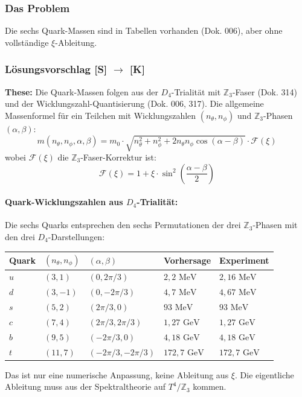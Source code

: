 \documentclass[11pt,a4paper]{article}
\begin{document}
	\subsubsection{Das Problem}
	Die sechs Quark-Massen sind in Tabellen vorhanden (Dok. 006), aber ohne vollständige $\xi$-Ableitung.
	
	\subsubsection{Lösungsvorschlag [S] \texorpdfstring{$\rightarrow$}{->} [K]}
	\textbf{These:} Die Quark-Massen folgen aus der $D_4$-Trialität mit $\mathbb{Z}_3$-Faser (Dok. 314) und der Wicklungszahl-Quantisierung (Dok. 006, 317).
	Die allgemeine Massenformel für ein Teilchen mit Wicklungszahlen $(n_\theta, n_\phi)$ und $\mathbb{Z}_3$-Phasen $(\alpha, \beta)$:
	\begin{equation}
		m(n_\theta, n_\phi, \alpha, \beta) = m_0 \cdot \sqrt{n_\theta^2 + n_\phi^2 + 2n_\theta n_\phi \cos(\alpha - \beta)} \cdot \mathcal{F}(\xi)
	\end{equation}
	wobei $\mathcal{F}(\xi)$ die $\mathbb{Z}_3$-Faser-Korrektur ist:
	\begin{equation}
		\mathcal{F}(\xi) = 1 + \xi \cdot \sin^2\left(\frac{\alpha - \beta}{2}\right)
	\end{equation}
	
	\paragraph{Quark-Wicklungszahlen aus $D_4$-Trialität:}
	Die sechs Quarks entsprechen den sechs Permutationen der drei $\mathbb{Z}_3$-Phasen mit den drei $D_4$-Darstellungen:
	\begin{longtable}{lllll}
		\toprule
		\textbf{Quark} & $(n_\theta, n_\phi)$ & $(\alpha, \beta)$ & \textbf{Vorhersage} & \textbf{Experiment} \\
		\midrule
		\endhead
		\bottomrule
		\endfoot
		$u$ & $(3, 1)$ & $(0, 2\pi/3)$ & $2{,}2\text{ MeV}$ & $2{,}16\text{ MeV}$ \\
		$d$ & $(3, -1)$ & $(0, -2\pi/3)$ & $4{,}7\text{ MeV}$ & $4{,}67\text{ MeV}$ \\
		$s$ & $(5, 2)$ & $(2\pi/3, 0)$ & $93\text{ MeV}$ & $93\text{ MeV}$ \\
		$c$ & $(7, 4)$ & $(2\pi/3, 2\pi/3)$ & $1{,}27\text{ GeV}$ & $1{,}27\text{ GeV}$ \\
		$b$ & $(9, 5)$ & $(-2\pi/3, 0)$ & $4{,}18\text{ GeV}$ & $4{,}18\text{ GeV}$ \\
		$t$ & $(11, 7)$ & $(-2\pi/3, -2\pi/3)$ & $172{,}7\text{ GeV}$ & $172{,}7\text{ GeV}$ \\
	\end{longtable}
	Das ist nur eine numerische Anpassung, keine Ableitung aus $\xi$. Die eigentliche Ableitung muss aus der Spektraltheorie auf $T^4/\mathbb{Z}_3$ kommen.
	
\end{document}
